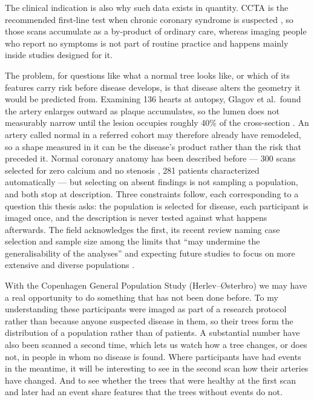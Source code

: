 The clinical indication is also why such data exists in quantity.
CCTA is the recommended first-line test when chronic coronary syndrome is suspected
\cite{knuuti2019esc}, so those scans accumulate as a by-product of ordinary care, whereas imaging
people who report no symptoms is not part of routine practice and happens mainly inside studies
designed for it.

The problem, for questions like what a normal tree looks like, or which of its features carry risk
before disease develops, is that disease alters the geometry it would be predicted from.
Examining 136 hearts at autopsy, Glagov et al.\ found the artery enlarges outward as plaque
accumulates, so the lumen does not measurably narrow until the lesion occupies roughly 40\% of the
cross-section \cite{glagov1987remodeling}.
An artery called normal in a referred cohort may therefore already have remodeled, so a shape
measured in it can be the disease's product rather than the risk that preceded it.
Normal coronary anatomy has been described before --- 300 scans selected for zero calcium and no
stenosis \cite{medranogracia2016atlas}, 281 patients characterized automatically
\cite{nannini2024characterization} --- but selecting on absent findings is not sampling a
population, and both stop at description.
Three constraints follow, each corresponding to a question this thesis asks: the population is
selected for disease, each participant is imaged once, and the description is never tested against
what happens afterwards.
The field acknowledges the first, its recent review naming case selection and sample size among the
limits that ``may undermine the generalisability of the analyses'' and expecting future studies to
focus on more extensive and diverse populations \cite{shen2026geometry}.


With the Copenhagen General Population Study (Herlev--{\O}sterbro) we may have a real opportunity to
do something that has not been done before. To my understanding these participants were imaged as part of a research protocol rather than because anyone suspected
disease in them, so their trees form the distribution of a population rather than of patients.
A substantial number have also been scanned a second time, which lets us watch how a tree changes,
or does not, in people in whom no disease is found.
Where participants have had events in the meantime, it will be interesting to see in the second scan how their arteries have changed. And to see whether the trees that were healthy at the first scan
and later had an event share features that the trees without events do not.
